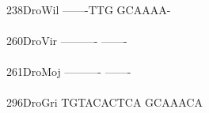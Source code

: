 \documentclass[11pt,twoside,reqno,a4paper]{article}
\begin{document}
{\hspace*{4\charwidth}\hspace*{7\charwidth}\hspace*{1\charwidth}\\
238\hspace*{1\charwidth}DroWil	-------TTG	GCAAAA-\\
\hspace*{4\charwidth}\hspace*{7\charwidth}\hspace*{1\charwidth}\\
260\hspace*{1\charwidth}DroVir	----------	-------\\
\hspace*{4\charwidth}\hspace*{7\charwidth}\hspace*{1\charwidth}\\
261\hspace*{1\charwidth}DroMoj	----------	-------\\
\hspace*{4\charwidth}\hspace*{7\charwidth}\hspace*{1\charwidth}\\
296\hspace*{1\charwidth}DroGri	TGTACACTCA	GCAAACA\\
\hspace*{4\charwidth}\hspace*{7\charwidth}\hspace*{1\charwidth}\\
\\
}
\end{document}
